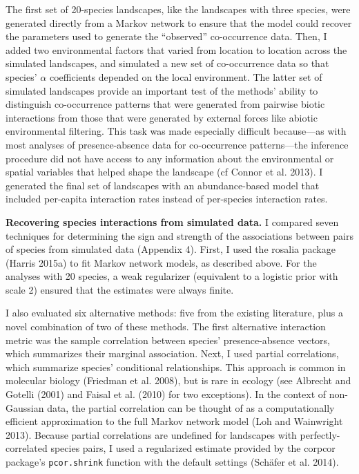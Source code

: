 \documentclass[12pt,]{article}
\begin{document}
\begin{spacing}{1.9}
\begin{flushleft}
The first set of 20-species landscapes, like the landscapes with three
species, were generated directly from a Markov network to ensure that
the model could recover the parameters used to generate the ``observed''
co-occurrence data. Then, I added two environmental factors that varied
from location to location across the simulated landscapes, and simulated
a new set of co-occurrence data so that species' \(\alpha\) coefficients
depended on the local environment. The latter set of simulated
landscapes provide an important test of the methods' ability to
distinguish co-occurrence patterns that were generated from pairwise
biotic interactions from those that were generated by external forces
like abiotic environmental filtering. This task was made especially
difficult because---as with most analyses of presence-absence data for
co-occurrence patterns---the inference procedure did not have access to
any information about the environmental or spatial variables that helped
shape the landscape (cf Connor et al. 2013). I generated the final set
of landscapes with an abundance-based model that included per-capita
interaction rates instead of per-species interaction rates.

\noindent \textbf{Recovering species interactions from simulated data.}
I compared seven techniques for determining the sign and strength of the
associations between pairs of species from simulated data (Appendix 4).
First, I used the rosalia package (Harris 2015a) to fit Markov network
models, as described above. For the analyses with 20 species, a weak
regularizer (equivalent to a logistic prior with scale 2) ensured that
the estimates were always finite.

I also evaluated six alternative methods: five from the existing
literature, plus a novel combination of two of these methods. The first
alternative interaction metric was the sample correlation between
species' presence-absence vectors, which summarizes their marginal
association. Next, I used partial correlations, which summarize species'
conditional relationships. This approach is common in molecular biology
(Friedman et al. 2008), but is rare in ecology (see Albrecht and Gotelli
(2001) and Faisal et al. (2010) for two exceptions). In the context of
non-Gaussian data, the partial correlation can be thought of as a
computationally efficient approximation to the full Markov network model
(Loh and Wainwright 2013). Because partial correlations are undefined
for landscapes with perfectly-correlated species pairs, I used a
regularized estimate provided by the corpcor package's
\texttt{pcor.shrink} function with the default settings (Schäfer et al.
2014).


\end{flushleft}
\end{spacing}
\end{document}
